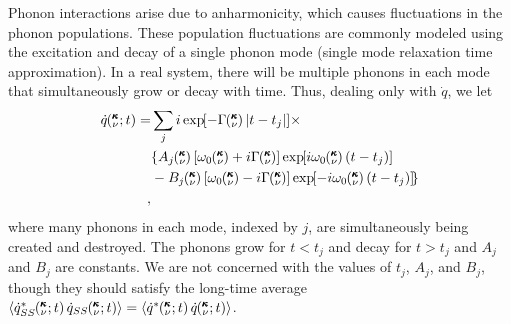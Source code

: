 \documentclass[letterpaper,12pt]{article}
\newcommand{\EXP}[1]{\exp\mspace{-5.0mu}\left[#1\right]\mspace{-3.0mu}}
\newcommand{\kvt}{\mspace{-4.0mu}\left(\mspace{-8.0mu}\begin{smallmatrix}&\pmb{\kappa} \\&\nu\end{smallmatrix}\mspace{-2.0mu};t\right)}
\newcommand{\kv}{\mspace{-4.0mu}\left(\mspace{-8.0mu}\begin{smallmatrix}&\pmb{\kappa} \\&\nu\end{smallmatrix}\mspace{-3.0mu}\right)}
\begin{document}
Phonon interactions arise due to anharmonicity, which causes fluctuations in the phonon populations. These population fluctuations are commonly modeled using the excitation and decay of
a single phonon mode (single mode relaxation time approximation).\cite{wallace1972,mcgaughey2004c}  In a real system, there will be multiple phonons in
each mode that simultaneously grow or decay with time.  Thus, dealing only
with $\dot{q}$, we let
\begin{equation}\label{A:E:qdot_A_kvbat}
\begin{split}
\dot{q}\kvt =& \sum_j i\EXP{-\Gamma\kv |t-t_j|}\times \\
& \lbrace A_j\kv\left[\omega_0\kv+i\Gamma\kv\right]\EXP{i\omega_0\kv (t-t_j)} \\
& -B_j\kv \left[\omega_0\kv-i\Gamma\kv\right]\EXP{-i\omega_0\kv (t-t_j) } \rbrace \\,
\end{split}
\end{equation}
where many phonons in each mode, indexed by $j$, are simultaneously being
created and destroyed.  The phonons grow for $t<t_j$ and decay for $t>t_j$
and $A_j$ and $B_j$ are constants.  We are  not concerned with the values of
$t_j$, $A_j$, and $B_j$, though they should satisfy the long-time average
$\langle\dot{q}_{SS}^*\kvt\dot{q}_{SS}\kvt\rangle=\langle\dot{q}^*\kvt\dot{q}\kvt\rangle$.
\end{document}
